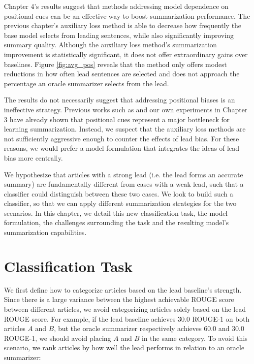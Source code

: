 Chapter 4's results suggest that methods addressing model dependence on positional cues can be an effective way to boost summarization performance. The previous chapter's auxiliary loss method is able to decrease how frequently the base model selects from leading sentences, while also significantly improving summary quality. Although the auxiliary loss method's summarization improvement is statistically significant, it does not offer extraordinary gains over baselines. Figure \ref{fig:avg_pos} reveals that the method only offers modest reductions in how often lead sentences are selected and does not approach the percentage an oracle summarizer selects from the lead.

The results do not necessarily suggest that addressing positional biases is an ineffective strategy. Previous works such as \cite{kedzie2018content} and our own experiments in Chapter 3 have already shown that positional cues represent a major bottleneck for learning summarization. Instead, we suspect that the auxiliary loss methods are not sufficiently aggressive enough to counter the effects of lead bias. For these reasons, we would prefer a model formulation that integrates the ideas of lead bias more centrally.

We hypothesize that articles with a strong lead (i.e. the lead forms an accurate summary) are fundamentally different from cases with a weak lead, such that a classifier could distinguish between these two cases. We look to build such a classifier, so that we can apply different summarization strategies for the two scenarios. In this chapter, we detail this new classification task, the model formulation, the challenges surrounding the task and the resulting model's summarization capabilities.

\section{Classification Task}
We first define how to categorize articles based on the lead baseline's strength. Since there is a large variance between the highest achievable ROUGE score between different articles, we avoid categorizing articles solely based on the lead ROUGE score. For example, if the lead baseline achieves 30.0 ROUGE-1 on both articles $A$ and $B$, but the oracle summarizer respectively achieves 60.0 and 30.0 ROUGE-1, we should avoid placing $A$ and $B$ in the same category. To avoid this scenario, we rank articles by how well the lead performs in relation to an oracle summarizer:

